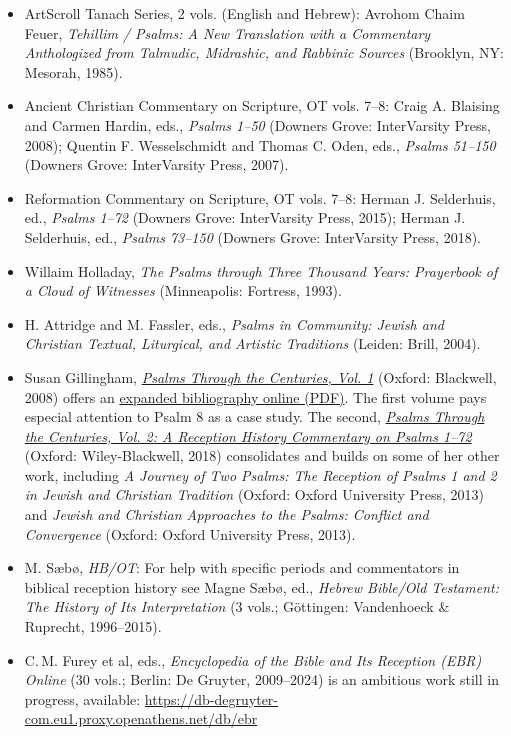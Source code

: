 \documentclass[titlepage]{article}
\begin{document}
\begin{itemize}

	\item ArtScroll Tanach Series, 2 vols. (English and Hebrew): Avrohom Chaim Feuer, \emph{Tehillim / Psalms: A New Translation with a Commentary Anthologized from Talmudic, Midrashic, and Rabbinic Sources} (Brooklyn, NY: Mesorah, 1985).

	\item Ancient Christian Commentary on Scripture, OT vols. 7--8:
	  Craig A. Blaising and Carmen Hardin, eds., \emph{Psalms 1--50} (Downers Grove: InterVarsity Press, 2008);
	  Quentin F. Wesselschmidt and Thomas C. Oden, eds., \emph{Psalms 51--150} (Downers Grove: InterVarsity Press, 2007).

	\item Reformation Commentary on Scripture, OT vols. 7--8:
	Herman J. Selderhuis, ed., \emph{Psalms 1--72} (Downers Grove: InterVarsity Press, 2015);
	Herman J. Selderhuis, ed., \emph{Psalms 73--150} (Downers Grove: InterVarsity Press, 2018).

	\item Willaim Holladay, \emph{The Psalms through Three Thousand Years: Prayerbook of a Cloud of Witnesses} (Minneapolis: Fortress, 1993).

	\item H. Attridge and M. Fassler, eds., \emph{Psalms in Community: Jewish and Christian Textual, Liturgical, and Artistic Traditions} (Leiden: Brill, 2004).

	\item Susan Gillingham, \emph{\href{https://onlinelibrary.wiley.com/doi/book/10.1002/9780470691748}{Psalms Through the Centuries, Vol. 1}} (Oxford: Blackwell, 2008) offers an \href{http://www.blackwellpublishing.com/pdf/9780631218555.pdf}{expanded bibliography online (PDF)}. The first volume pays especial attention to Psalm 8 as a case study. The second, \emph{\href{https://onlinelibrary.wiley.com/doi/book/10.1002/9781118832196}{Psalms Through the Centuries, Vol. 2: A Reception History Commentary on Psalms 1–72}} (Oxford: Wiley-Blackwell, 2018) consolidates and builds on some of her other work, including \emph{A Journey of Two Psalms: The Reception of Psalms 1 and 2 in Jewish and Christian Tradition} (Oxford: Oxford University Press, 2013) and \emph{Jewish and Christian Approaches to the Psalms: Conflict and Convergence} (Oxford: Oxford University Press, 2013).

	\item M. Sæbø, \emph{HB/OT}: For help with specific periods and commentators in biblical reception history see Magne Sæbø, ed., \emph{Hebrew Bible/Old Testament: The History of Its Interpretation} (3 vols.; Göttingen: Vandenhoeck \& Ruprecht, 1996--2015).

	\item C.\,M. Furey et al, eds., \emph{Encyclopedia of the Bible and Its Reception (EBR) Online} (30 vols.; Berlin: De Gruyter, 2009–2024) is an ambitious work still in progress, available: \url{https://db-degruyter-com.eu1.proxy.openathens.net/db/ebr}

\end{itemize}
\end{document}
